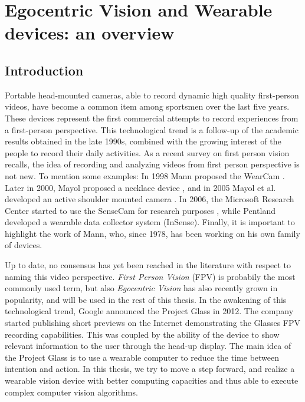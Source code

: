 
\chapter{Egocentric Vision and Wearable devices: an overview}



\section{Introduction}

Portable head-mounted cameras, able to record dynamic high quality first-person videos, have become a common
item among sportsmen over the last five years. These devices represent the first commercial attempts to record
experiences from a first-person perspective. This technological trend is a follow-up of the academic results
obtained in the late 1990s, combined with the growing interest of the people to record their daily activities.
As a recent survey on first person vision \cite{surveyfpv} recalls, the idea of recording and analyzing videos from first person perspective is not new. To mention some examples:
In 1998 Mann proposed the WearCam \cite{mann1998wearcam}. Later in 2000, Mayol \etal proposed a necklace device \cite{mayol2002wearable} , and in 2005 Mayol et al. developed an active shoulder mounted camera \cite{mayol2005applying}. In 2006, the Microsoft Research Center started to use the SenseCam for research purposes \cite{hodges2006sensecam}, while Pentland \etal \cite{blum2006insense} developed a wearable data collector system (InSense). Finally, it is important to
highlight the work of Mann, who, since 1978, has been working on his own family of devices. 

Up to date, no consensus has yet been reached in the literature with respect to naming this video perspective.
\textit{First Person Vision} (FPV) is probabily the most commonly used term, but also \textit{Egocentric Vision}
has also recently grown in popularity, and will be used in the rest of this thesis.  In the awakening of this technological trend, Google announced the Project Glass in 2012. The company started publishing short previews on the Internet demonstrating
the Glasses FPV recording capabilities. This was coupled by the ability of the device to show relevant information to the user through the head-up display. The main idea of the Project Glass is to use a wearable computer to reduce the time between intention and
action. In this thesis, we try to move a step forward, and realize a wearable vision device with better computing capacities and thus able to execute complex computer vision algorithms.

